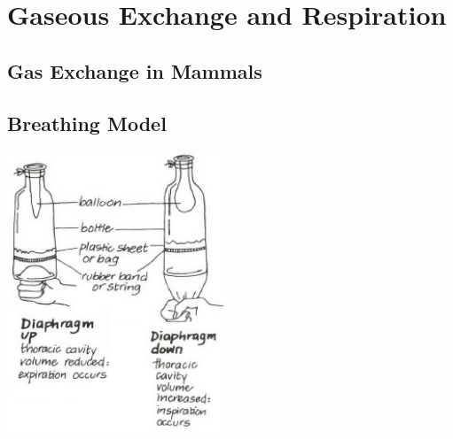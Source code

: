 \section{Gaseous Exchange and Respiration}

\begin{multicols}{2}


\section*{Gas Exchange in Mammals}


\subsection{Breathing Model} %

\begin{center}
\includegraphics[width=0.49\textwidth]{./img/vso/breathing-model.jpg}
\end{center}


\end{multicols}
